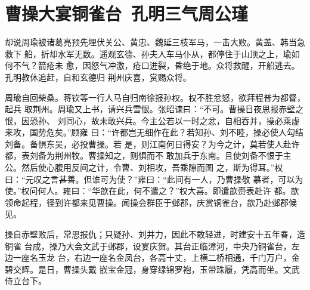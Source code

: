 \chapter{曹操大宴铜雀台~孔明三气周公瑾}

却说周瑜被诸葛亮预先埋伏关公、黄忠、魏延三枝军马，一击大败。黄盖、韩当急救下
船，折却水军无数。遥观玄德、孙夫人车马仆从，都停住于山顶之上，瑜如何不气？箭疮未
愈，因怒气冲激，疮口迸裂，昏绝于地。众将救醒，开船逃去。孔明教休追赶，自和玄德归
荆州庆喜，赏赐众将。

周瑜自回柴桑。蒋钦等一行人马自归南徐报孙权。权不胜忿怒，欲拜程普为都督，起兵
取荆州。周瑜又上书，请兴兵雪恨。张昭谏曰：“不可。曹操日夜思报赤壁之恨，因恐孙、
刘同心，故未敢兴兵。今主公若以一时之忿，自相吞并，操必乘虚来攻，国势危矣。”顾雍
曰：“许都岂无细作在此？若知孙、刘不睦，操必使人勾结刘备。备惧东吴，必投曹操。若
是，则江南何日得安？为今之计，莫若使人赴许都，表刘备为荆州牧。曹操知之，则惧而不
敢加兵于东南。且使刘备不恨于主公。然后使心腹用反间之计，令曹、刘相攻，吾乘隙而图
之，斯为得耳。”权曰：“元叹之言甚善。但谁可为使？”雍曰：“此间有一人，乃曹操敬
慕者，可以为使。”权问何人。雍曰：“华歆在此，何不遣之？”权大喜。即遣歆赍表赴许
都。歆领命起程，径到许都来见曹操。闻操会群臣于邺郡，庆赏铜雀台，歆乃赴邺郡候见。

操自赤壁败后，常思报仇；只疑孙、刘并力，因此不敢轻进，时建安十五年春，造铜雀
台成，操乃大会文武于邺郡，设宴庆贺。其台正临漳河，中央乃铜雀台，左边一座名玉龙
台，右边一座名金凤台，各高十丈，上横二桥相通，千门万户，金碧交辉。是日，曹操头戴
嵌宝金冠，身穿绿锦罗袍，玉带珠履，凭高而坐。文武侍立台下。

